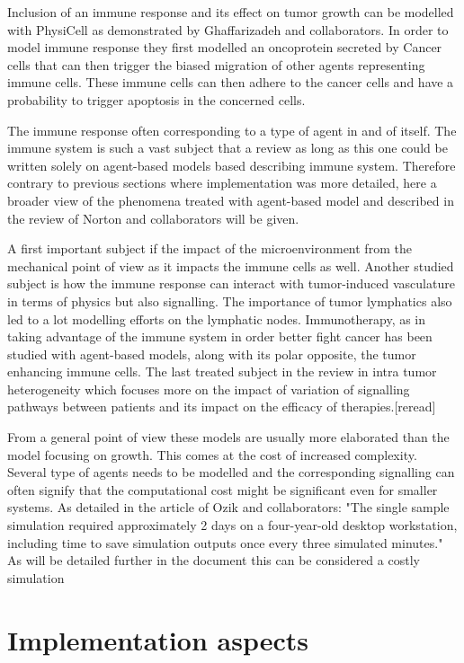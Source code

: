 \documentclass[11pt,a4paper]{article}
\begin{document}
Inclusion of an immune response and its effect on tumor growth can be modelled with PhysiCell as demonstrated by Ghaffarizadeh and collaborators.\cite{Ghaffarizadeh2017} In order to model immune response they first modelled an oncoprotein secreted by Cancer cells that can then trigger the biased migration of other agents representing immune cells. These immune cells can then adhere to the cancer cells and have a probability to trigger apoptosis in the concerned cells.

The immune response often corresponding to a type of agent in and of itself. The immune system is such a vast subject that a review as long as this one could be written solely on agent-based models based describing immune system. Therefore contrary to previous sections where implementation was more detailed, here a broader view of the phenomena treated with agent-based model and described in the review of Norton and collaborators will be given.

A first important subject if the impact of the microenvironment from the mechanical point of view as it impacts the immune cells as well. Another studied subject is how the immune response can interact with tumor-induced vasculature in terms of physics but also signalling. The importance of tumor lymphatics also led to a lot modelling efforts on the lymphatic nodes. Immunotherapy, as in taking advantage of the immune system in order better fight cancer has been studied with agent-based models, along with its polar opposite, the tumor enhancing immune cells. The last treated subject in the review in intra tumor heterogeneity which focuses more on the impact of variation of signalling pathways between patients and its impact on the efficacy of therapies.[reread]

From a general point of view these models are usually more elaborated than the model focusing on growth. This comes at the cost of increased complexity. Several type of agents needs to be modelled and the corresponding signalling can often signify that the computational cost might be significant even for smaller systems. As detailed in the article of Ozik and collaborators: "The single sample simulation required approximately 2 days on a four-year-old desktop workstation, including time to save simulation outputs once every three simulated minutes." \cite{Ozik2018} As will be detailed further in the document this can be considered a costly simulation

\section{Implementation aspects}
\end{document}
